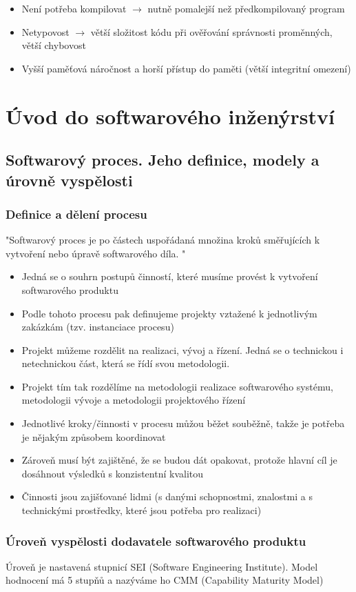 \documentclass[10pt,a4paper]{article}
\begin{document}
\begin{itemize}
\item Není potřeba kompilovat $\rightarrow$ nutně pomalejší než předkompilovaný program
\item Netypovost $\rightarrow$ větší složitost kódu při ověřování správnosti proměnných, větší chybovost
\item Vyšší paměťová náročnost a horší přístup do paměti (větší integritní omezení)
\end{itemize}
\newpage
\section{Úvod do softwarového inženýrství}
\subsection{Softwarový proces. Jeho definice, modely a úrovně vyspělosti}
\subsubsection{Definice a dělení procesu}
"Softwarový proces je po částech uspořádaná množina kroků směřujících k vytvoření nebo úpravě softwarového díla. "

\begin{itemize}
\item Jedná se o souhrn postupů činností, které musíme provést k vytvoření softwarového produktu
\item Podle tohoto procesu pak definujeme projekty vztažené k jednotlivým zakázkám (tzv. instanciace procesu)
\item Projekt můžeme rozdělit na realizaci, vývoj a řízení. Jedná se o technickou i netechnickou část, která se řídí svou metodologii.
\item Projekt tím tak rozdělíme na metodologii realizace softwarového systému, metodologii vývoje a metodologii projektového řízení
\item Jednotlivé kroky/činnosti v procesu můžou běžet souběžně, takže je potřeba je nějakým způsobem koordinovat
\item Zároveň musí být zajištěné, že se budou dát opakovat, protože hlavní cíl je dosáhnout výsledků s konzistentní kvalitou
\item Činnosti jsou zajišťované lidmi (s danými schopnostmi, znalostmi a s technickými prostředky, které jsou potřeba pro realizaci)
\end{itemize}
\subsubsection{Úroveň vyspělosti dodavatele softwarového produktu}
Úroveň je nastavená stupnicí SEI (Software Engineering Institute). Model hodnocení má 5 stupňů a nazýváme ho CMM (Capability Maturity Model)
\end{document}
